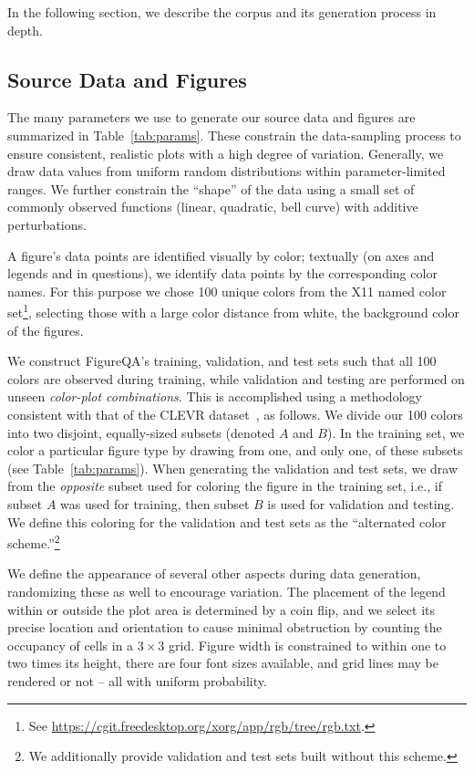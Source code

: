 \documentclass{article} %
\begin{document}
In the following section, we describe the corpus and its generation process in depth.

\subsection{Source Data and Figures}
\label{sec:source_data_and_figures}
The many parameters we use to generate our source data and figures are summarized in Table~\ref{tab:params}.
These constrain the data-sampling process to ensure consistent, realistic plots with a high degree of variation.
Generally, we draw data values from uniform random distributions within parameter-limited ranges.
We further constrain the ``shape'' of the data using a small set of commonly observed functions (linear, quadratic, bell curve) with additive perturbations.

A figure's data points are identified visually by color; textually (on axes and legends and in questions), we identify data points by the corresponding color names.
For this purpose we chose 100 unique colors from the X11 named color set\footnote{See \url{https://cgit.freedesktop.org/xorg/app/rgb/tree/rgb.txt}.}, selecting those with a large color distance from white, the background color of the figures.

We construct FigureQA's training, validation, and test sets such that all 100 colors are observed during training, while validation and testing are performed on unseen \emph{color-plot combinations}.
This is accomplished using a methodology consistent with that of the CLEVR dataset~\citep{johnson2016clevr}, as follows.
We divide our 100 colors into two disjoint, equally-sized subsets (denoted $A$ and $B$). In the training set, we color a particular figure type by drawing from one, and only one, of these subsets (see Table~\ref{tab:params}).
When generating the validation and test sets, we draw from the \emph{opposite} subset used for coloring the figure in the training set, i.e., if subset $A$ was used for training, then subset $B$ is used for validation and testing.
We define this coloring for the validation and test sets as the  ``alternated color scheme.''\footnote{We additionally provide validation and test sets built without this scheme.}

We define the appearance of several other aspects during data generation, randomizing these as well to encourage variation.
The placement of the legend within or outside the plot area is determined by a coin flip, and we select its precise location and orientation to cause minimal obstruction by counting the occupancy of cells in a $3\times3$ grid.
Figure width is constrained to within one to two times its height, there are four font sizes available, and grid lines may be rendered or not -- all with uniform probability.
\end{document}

